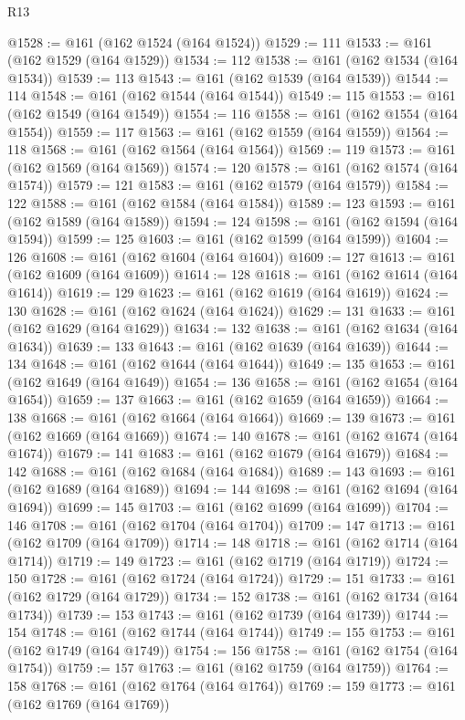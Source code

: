 \begin{lexlean}{R13}
\begin{coremodule}
@1528 := @161 (@162 @1524 (@164 @1524))
@1529 := 111
@1533 := @161 (@162 @1529 (@164 @1529))
@1534 := 112
@1538 := @161 (@162 @1534 (@164 @1534))
@1539 := 113
@1543 := @161 (@162 @1539 (@164 @1539))
@1544 := 114
@1548 := @161 (@162 @1544 (@164 @1544))
@1549 := 115
@1553 := @161 (@162 @1549 (@164 @1549))
@1554 := 116
@1558 := @161 (@162 @1554 (@164 @1554))
@1559 := 117
@1563 := @161 (@162 @1559 (@164 @1559))
@1564 := 118
@1568 := @161 (@162 @1564 (@164 @1564))
@1569 := 119
@1573 := @161 (@162 @1569 (@164 @1569))
@1574 := 120
@1578 := @161 (@162 @1574 (@164 @1574))
@1579 := 121
@1583 := @161 (@162 @1579 (@164 @1579))
@1584 := 122
@1588 := @161 (@162 @1584 (@164 @1584))
@1589 := 123
@1593 := @161 (@162 @1589 (@164 @1589))
@1594 := 124
@1598 := @161 (@162 @1594 (@164 @1594))
@1599 := 125
@1603 := @161 (@162 @1599 (@164 @1599))
@1604 := 126
@1608 := @161 (@162 @1604 (@164 @1604))
@1609 := 127
@1613 := @161 (@162 @1609 (@164 @1609))
@1614 := 128
@1618 := @161 (@162 @1614 (@164 @1614))
@1619 := 129
@1623 := @161 (@162 @1619 (@164 @1619))
@1624 := 130
@1628 := @161 (@162 @1624 (@164 @1624))
@1629 := 131
@1633 := @161 (@162 @1629 (@164 @1629))
@1634 := 132
@1638 := @161 (@162 @1634 (@164 @1634))
@1639 := 133
@1643 := @161 (@162 @1639 (@164 @1639))
@1644 := 134
@1648 := @161 (@162 @1644 (@164 @1644))
@1649 := 135
@1653 := @161 (@162 @1649 (@164 @1649))
@1654 := 136
@1658 := @161 (@162 @1654 (@164 @1654))
@1659 := 137
@1663 := @161 (@162 @1659 (@164 @1659))
@1664 := 138
@1668 := @161 (@162 @1664 (@164 @1664))
@1669 := 139
@1673 := @161 (@162 @1669 (@164 @1669))
@1674 := 140
@1678 := @161 (@162 @1674 (@164 @1674))
@1679 := 141
@1683 := @161 (@162 @1679 (@164 @1679))
@1684 := 142
@1688 := @161 (@162 @1684 (@164 @1684))
@1689 := 143
@1693 := @161 (@162 @1689 (@164 @1689))
@1694 := 144
@1698 := @161 (@162 @1694 (@164 @1694))
@1699 := 145
@1703 := @161 (@162 @1699 (@164 @1699))
@1704 := 146
@1708 := @161 (@162 @1704 (@164 @1704))
@1709 := 147
@1713 := @161 (@162 @1709 (@164 @1709))
@1714 := 148
@1718 := @161 (@162 @1714 (@164 @1714))
@1719 := 149
@1723 := @161 (@162 @1719 (@164 @1719))
@1724 := 150
@1728 := @161 (@162 @1724 (@164 @1724))
@1729 := 151
@1733 := @161 (@162 @1729 (@164 @1729))
@1734 := 152
@1738 := @161 (@162 @1734 (@164 @1734))
@1739 := 153
@1743 := @161 (@162 @1739 (@164 @1739))
@1744 := 154
@1748 := @161 (@162 @1744 (@164 @1744))
@1749 := 155
@1753 := @161 (@162 @1749 (@164 @1749))
@1754 := 156
@1758 := @161 (@162 @1754 (@164 @1754))
@1759 := 157
@1763 := @161 (@162 @1759 (@164 @1759))
@1764 := 158
@1768 := @161 (@162 @1764 (@164 @1764))
@1769 := 159
@1773 := @161 (@162 @1769 (@164 @1769))

\end{coremodule}
\end{lexlean}
